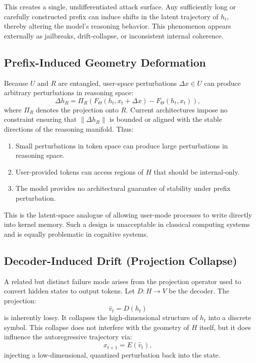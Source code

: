 \documentclass[11pt,a4paper]{article}
\begin{document}
This creates a single, undifferentiated attack surface. Any sufficiently long or carefully constructed prefix can induce shifts in the latent trajectory of $h_t$, thereby altering the model's reasoning behavior. This phenomenon appears externally as jailbreaks, drift-collapse, or inconsistent internal coherence.

\subsection{Prefix-Induced Geometry Deformation}

Because $U$ and $R$ are entangled, user-space perturbations $\Delta x \in U$ can produce arbitrary perturbations in reasoning space:
\begin{equation}
\Delta h_R = \Pi_R(F_\Theta(h_t, x_t + \Delta x) - F_\Theta(h_t, x_t)),
\end{equation}
where $\Pi_R$ denotes the projection onto $R$. Current architectures impose no constraint ensuring that $\|\Delta h_R\|$ is bounded or aligned with the stable directions of the reasoning manifold. Thus:

\begin{enumerate}
    \item Small perturbations in token space can produce large perturbations in reasoning space.
    \item User-provided tokens can access regions of $H$ that should be internal-only.
    \item The model provides no architectural guarantee of stability under prefix perturbation.
\end{enumerate}

This is the latent-space analogue of allowing user-mode processes to write directly into kernel memory. Such a design is unacceptable in classical computing systems and is equally problematic in cognitive systems.

\subsection{Decoder-Induced Drift (Projection Collapse)}

A related but distinct failure mode arises from the projection operator used to convert hidden states to output tokens. Let $D: H \to V$ be the decoder. The projection:
\begin{equation}
\hat{v}_t = D(h_t)
\end{equation}
is inherently lossy. It collapses the high-dimensional structure of $h_t$ into a discrete symbol. This collapse does not interfere with the geometry of $H$ itself, but it does influence the autoregressive trajectory via:
\begin{equation}
x_{t+1} = E(\hat{v}_t),
\end{equation}
injecting a low-dimensional, quantized perturbation back into the state.
\end{document}
